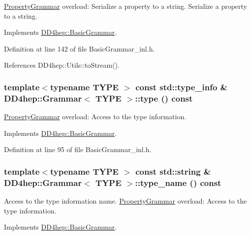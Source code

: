 \hyperlink{class_d_d4hep_1_1_property_grammar}{PropertyGrammar} overload: Serialize a property to a string. Serialize a property to a string. 

Implements \hyperlink{class_d_d4hep_1_1_basic_grammar_a92fb01e1333540f417ef8151e774fd72}{DD4hep::BasicGrammar}.

Definition at line 142 of file BasicGrammar\_\-inl.h.

References DD4hep::Utils::toStream().\hypertarget{class_d_d4hep_1_1_grammar_a5fcd84c1a1f9b641083264f6127cf431}{
\subsubsection[{type}]{\setlength{\rightskip}{0pt plus 5cm}template$<$typename TYPE $>$ const std::type\_\-info \& {\bf DD4hep::Grammar}$<$ TYPE $>$::type () const}}
\label{class_d_d4hep_1_1_grammar_a5fcd84c1a1f9b641083264f6127cf431}


\hyperlink{class_d_d4hep_1_1_property_grammar}{PropertyGrammar} overload: Access to the type information. 

Implements \hyperlink{class_d_d4hep_1_1_basic_grammar_a697d38c53f67a86bb182350dad284402}{DD4hep::BasicGrammar}.

Definition at line 95 of file BasicGrammar\_\-inl.h.\hypertarget{class_d_d4hep_1_1_grammar_aeeaf492d2fab90c5d5fb032f7efaa42e}{
\subsubsection[{type\_\-name}]{\setlength{\rightskip}{0pt plus 5cm}template$<$typename TYPE $>$ const std::string \& {\bf DD4hep::Grammar}$<$ TYPE $>$::type\_\-name () const}}
\label{class_d_d4hep_1_1_grammar_aeeaf492d2fab90c5d5fb032f7efaa42e}


Access to the type information name. \hyperlink{class_d_d4hep_1_1_property_grammar}{PropertyGrammar} overload: Access to the type information. 

Implements \hyperlink{class_d_d4hep_1_1_basic_grammar_acae3770beb2e60eaf76c7d85722c8bc2}{DD4hep::BasicGrammar}.

